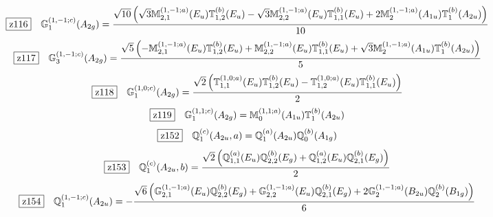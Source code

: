\documentclass[fleqn,10pt,landscape]{jsarticle}
\begin{document}
\begin{dmath*}
\hspace*{3mm}\fbox{z116}\quad \mathbb{G}_{1}^{(1,-1;c)}(A_{2g})=\frac{\sqrt{10} \left(\sqrt{3} \mathbb{M}_{2,1}^{(1,-1;a)}(E_{u}) \mathbb{T}_{1,2}^{(b)}(E_{u}) - \sqrt{3} \mathbb{M}_{2,2}^{(1,-1;a)}(E_{u}) \mathbb{T}_{1,1}^{(b)}(E_{u}) + 2 \mathbb{M}_{2}^{(1,-1;a)}(A_{1u}) \mathbb{T}_{1}^{(b)}(A_{2u})\right)}{10}
\end{dmath*}
\begin{dmath*}
\hspace*{3mm}\fbox{z117}\quad \mathbb{G}_{3}^{(1,-1;c)}(A_{2g})=\frac{\sqrt{5} \left(- \mathbb{M}_{2,1}^{(1,-1;a)}(E_{u}) \mathbb{T}_{1,2}^{(b)}(E_{u}) + \mathbb{M}_{2,2}^{(1,-1;a)}(E_{u}) \mathbb{T}_{1,1}^{(b)}(E_{u}) + \sqrt{3} \mathbb{M}_{2}^{(1,-1;a)}(A_{1u}) \mathbb{T}_{1}^{(b)}(A_{2u})\right)}{5}
\end{dmath*}
\begin{dmath*}
\hspace*{3mm}\fbox{z118}\quad \mathbb{G}_{1}^{(1,0;c)}(A_{2g})=\frac{\sqrt{2} \left(\mathbb{T}_{1,1}^{(1,0;a)}(E_{u}) \mathbb{T}_{1,2}^{(b)}(E_{u}) - \mathbb{T}_{1,2}^{(1,0;a)}(E_{u}) \mathbb{T}_{1,1}^{(b)}(E_{u})\right)}{2}
\end{dmath*}
\begin{dmath*}
\hspace*{3mm}\fbox{z119}\quad \mathbb{G}_{1}^{(1,1;c)}(A_{2g})=\mathbb{M}_{0}^{(1,1;a)}(A_{1u}) \mathbb{T}_{1}^{(b)}(A_{2u})
\end{dmath*}
\begin{dmath*}
\hspace*{3mm}\fbox{z152}\quad \mathbb{Q}_{1}^{(c)}(A_{2u},a)=\mathbb{Q}_{1}^{(a)}(A_{2u}) \mathbb{Q}_{0}^{(b)}(A_{1g})
\end{dmath*}
\begin{dmath*}
\hspace*{3mm}\fbox{z153}\quad \mathbb{Q}_{1}^{(c)}(A_{2u},b)=\frac{\sqrt{2} \left(\mathbb{Q}_{1,1}^{(a)}(E_{u}) \mathbb{Q}_{2,2}^{(b)}(E_{g}) + \mathbb{Q}_{1,2}^{(a)}(E_{u}) \mathbb{Q}_{2,1}^{(b)}(E_{g})\right)}{2}
\end{dmath*}
\begin{dmath*}
\hspace*{3mm}\fbox{z154}\quad \mathbb{Q}_{1}^{(1,-1;c)}(A_{2u})=- \frac{\sqrt{6} \left(\mathbb{G}_{2,1}^{(1,-1;a)}(E_{u}) \mathbb{Q}_{2,2}^{(b)}(E_{g}) + \mathbb{G}_{2,2}^{(1,-1;a)}(E_{u}) \mathbb{Q}_{2,1}^{(b)}(E_{g}) + 2 \mathbb{G}_{2}^{(1,-1;a)}(B_{2u}) \mathbb{Q}_{2}^{(b)}(B_{1g})\right)}{6}
\end{dmath*}
\end{document}

